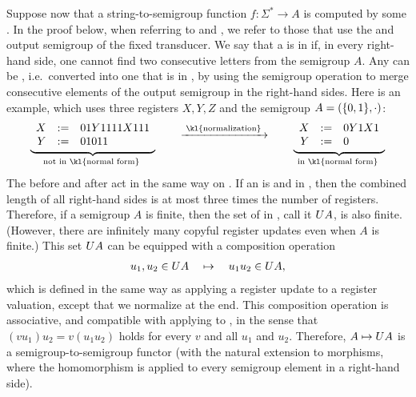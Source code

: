 \AP Suppose now that a string-to-semigroup function $f\colon \Sigma^* \to A$ is
computed by some  . In the proof below, when referring to  and , we refer to those that use the  and output semigroup of the fixed transducer. We say that a  is in  if, in every right-hand side, one cannot find two consecutive letters from the semigroup $A$.
Any  can be , i.e.~converted into one that is in , by using the semigroup operation to merge consecutive elements of the output semigroup in the right-hand sides.
Here is an example, which uses three registers $X,Y,Z$ and the semigroup $A = (\{0,1\}, \cdot)$:
\begin{align*}
  \myunderbrace{
  \begin{array}{rcl}
    X &:=& 01Y1111X111\\
    Y &:=& 01011
  \end{array}
  }{not in \kl{normal form}}
  \qquad \xrightarrow{\;\text{\kl{normalization}}\;} \qquad
  \myunderbrace{
  \begin{array}{rcl}
    X &:=& 0Y1X1\\
    Y &:=& 0
  \end{array}
  }{in \kl{normal form}}
\end{align*}
The  before and after  act in the same way on
. If an  is  and in , then the
combined length of all right-hand sides is at most three times the number of
registers. Therefore, if a semigroup $A$ is finite, then the set of 
 in , call it $\functoru A$, is also finite.
(However, there are infinitely many copyful register updates even when $A$ is
finite.) This set $\functoru A$ can be equipped with a composition operation
\begin{align*}
    u_1,u_2 \in \functoru A  \quad \mapsto \quad u_1u_2 \in \functoru A,
\end{align*}
which is defined in the same way as applying a register update to a register
valuation, except that we normalize at the end. This composition operation is
associative, and  compatible with applying  to , in the sense that $(vu_1)u_2 = v(u_1u_2)$ holds for every  $v$ and all  $u_1$ and $u_2$. Therefore, $A \mapsto \functoru A$ is a  semigroup-to-semigroup functor (with the natural extension to morphisms, where the homomorphism is applied to every semigroup element in a right-hand side). 

